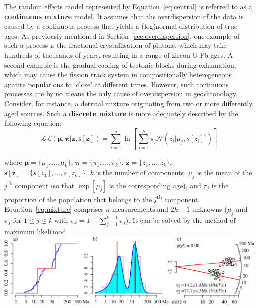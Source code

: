 \begin{refsection}
The random effects model represented by Equation~\ref{eq:central} is
referred to as a \textbf{continuous mixture} model. It assumes that
the overdispersion of the data is caused by a continuous process that
yields a (log)normal distribution of true ages. As previously
mentioned in Section~\ref{sec:overdispersion}, one example of such a
process is the fractional crystallisation of plutons, which may take
hundreds of thousands of years, resulting in a range of zircon U-Pb
ages. A second example is the gradual cooling of tectonic blocks
during exhumation, which may cause the fission track system in
compositionally heterogeneous apatite populations to `close' at
different times. However, such continuous processes are by no means
the only cause of overdispersion in geochronology.\\

Consider, for instance, a detrital mixture originating from two or
more differently aged sources. Such a \textbf{discrete mixture} is
more adequately described by the following equation:
\begin{equation}
  \mathcal{LL}({\boldsymbol\mu},{\boldsymbol\pi}|\mathbf{z},\mathbf{s[z]}) =
  \sum_{i=1}^n\ln\!\left[\sum_{j=1}^k \pi_j \mathcal{N}\left( z_i | \mu_j, s[z_i]^2\right)\right]
  \label{eq:mixture}
\end{equation}

\noindent where ${\boldsymbol\mu}=\{\mu_1,\ldots,\mu_k\}$,
${\boldsymbol\pi}=\{\pi_1,\ldots,\pi_k\}$,
$\mathbf{z}=\{z_1,\ldots,z_k\}$,
$\mathbf{s[z]}=\{s[z_1],\ldots,s[z_k]\}$, $k$ is the number of
components, $\mu_j$ is the mean of the $j$\textsuperscript{th}
component (so that $\exp[\mu_j]$ is the corresponding age), and
$\pi_j$ is the proportion of the population that belongs to the
$j$\textsuperscript{th} component. Equation~\ref{eq:mixture} comprises
$n$ measurements and $2k-1$ unknowns ($\mu_j$ and $\pi_j$ for $1 \leq
j \leq k$ with $\pi_k=1-\sum_{j=1}^{k-1}\pi_j$). It can be solved by
the method of maximum likelihood.\\

\noindent\includegraphics[width=\textwidth]{../figures/discretemixtures.pdf}
\begingroup {}
\label{fig:discretemixtures}
\endgroup


\end{refsection}
